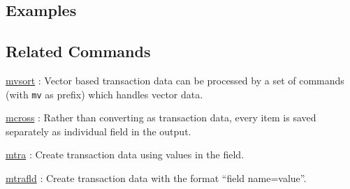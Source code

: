 \subsection*{Examples}

\subsection*{Related Commands}
\hyperref[sect:mvsort] {mvsort} : Vector based transaction data can be processed by a set of commands  (with \verb|mv| as prefix) which handles vector data.

\hyperref[sect:mcross] {mcross} : Rather than converting as transaction data, every item is saved separately as individual field in the output.

\hyperref[sect:mtra] {mtra} : Create transaction data using values in the field.

\hyperref[sect:mtrafld] {mtrafld} :  Create transaction data with the format “field name=value”.
%
